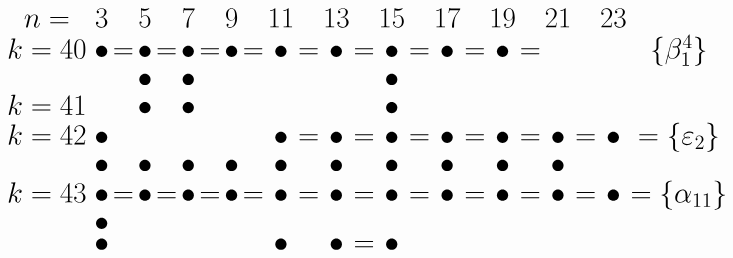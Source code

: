 \documentclass{article}
\begin{document}
\(
\begin{tikzcd}[nodes={font=\huge,inner sep=0pt},row sep=0.2cm,column sep=0.1cm]
n= & & 3 & & 5 & & 7 & & 9 & & 11 & & 13 & & 15 & & 17 && 19 && 21 && 23 \\
k=40 && \bullet &=& \bullet &=& \bullet &=& \bullet &=& \bullet &=& \bullet &=& \bullet &=& \bullet &=& \bullet &=&&&& \{\beta_1^4\} \\
&&&& \bullet && \bullet && && && && \bullet &&  \\
k=41 &&&& \bullet && \bullet && && && && \bullet &&  \\
k=42 && \bullet && && && && \bullet &=& \bullet &=& \bullet &=& \bullet  &=& \bullet  &=& \bullet  &=& \bullet & =\{\varepsilon_2\} \\
 && \bullet && \bullet && \bullet && \bullet && \bullet && \bullet && \bullet && \bullet && \bullet && \bullet \\
k=43 && \bullet &=& \bullet &=& \bullet &=& \bullet &=& \bullet &=& \bullet &=& \bullet &=& \bullet  &=& \bullet &=& \bullet&=& \bullet & = \{\alpha_{11}\} \\
&& \bullet && && && \\
&& \bullet && && && && \bullet && \bullet &=& \bullet   \\
\\
\end{tikzcd}
\)
\end{document}
